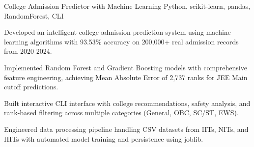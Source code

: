 \resumeSubheading
{College Admission Predictor with Machine Learning}{}
{Python, scikit-learn, pandas, RandomForest, CLI}{}
\resumeItemListStart
\item Developed an intelligent college admission prediction system using machine learning algorithms with 93.53\% accuracy on 200,000+ real admission records from 2020-2024.
\item Implemented Random Forest and Gradient Boosting models with comprehensive feature engineering, achieving Mean Absolute Error of 2,737 ranks for JEE Main cutoff predictions.
\item Built interactive CLI interface with college recommendations, safety analysis, and rank-based filtering across multiple categories (General, OBC, SC/ST, EWS).
\item Engineered data processing pipeline handling CSV datasets from IITs, NITs, and IIITs with automated model training and persistence using joblib.
\resumeItemListEnd
